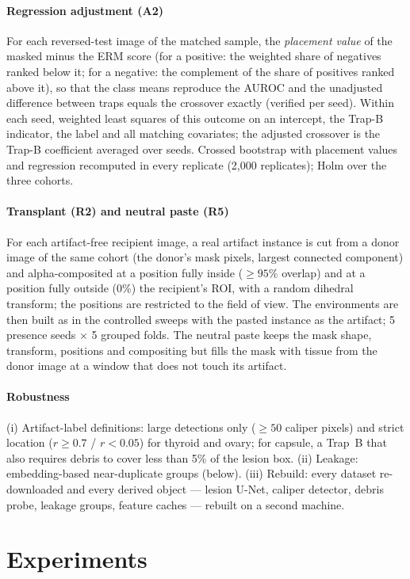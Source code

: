\paragraph{Regression adjustment (A2)} For each reversed-test image of the matched sample, the \emph{placement value} of
the masked minus the ERM score (for a positive: the weighted share of negatives ranked below it; for a negative: the
complement of the share of positives ranked above it), so that the class means reproduce the AUROC and the unadjusted
difference between traps equals the crossover exactly (verified per seed). Within each seed, weighted least squares of
this outcome on an intercept, the Trap-B indicator, the label and all matching covariates; the adjusted crossover is the
Trap-B coefficient averaged over seeds. Crossed bootstrap with placement values and regression recomputed in every
replicate (2,000 replicates); Holm over the three cohorts.
\paragraph{Transplant (R2) and neutral paste (R5)} For each artifact-free recipient image, a real artifact instance is cut
from a donor image of the same cohort (the donor's mask pixels, largest connected component) and alpha-composited at a
position fully inside ($\ge95\%$ overlap) and at a position fully outside (0\%) the recipient's ROI, with a random dihedral
transform; the positions are restricted to the field of view. The environments are then built as in the controlled sweeps
with the pasted instance as the artifact; 5 presence seeds $\times$ 5 grouped folds. The neutral paste keeps the mask
shape, transform, positions and compositing but fills the mask with tissue from the donor image at a window that does not
touch its artifact.
\paragraph{Robustness} (i) Artifact-label definitions: large detections only ($\ge50$ caliper pixels) and strict location
($r\ge0.7$ / $r<0.05$) for thyroid and ovary; for capsule, a Trap~B that also requires debris to cover less than 5\% of the
lesion box. (ii) Leakage: embedding-based near-duplicate groups (below). (iii) Rebuild: every dataset re-downloaded and
every derived object --- lesion U-Net, caliper detector, debris probe, leakage groups, feature caches --- rebuilt on a
second machine.

\section{Experiments}


